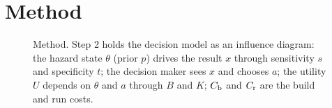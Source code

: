 \section{Method}
\label{sec:method}

\begin{figure}[t]
  \centering
  \resizebox{0.9\linewidth}{!}{}
  \caption{Method. Step 2 holds the decision model as an influence diagram: the hazard state $\theta$ (prior $p$) drives the result $x$ through sensitivity $s$ and specificity $t$; the decision maker sees $x$ and chooses $a$; the utility $U$ depends on $\theta$ and $a$ through $B$ and $K$; $C_\mathrm{b}$ and $C_\mathrm{r}$ are the build and run costs.}
  \label{fig:method}
\end{figure}

